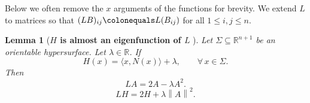 \documentclass[12pt,reqno]{amsart}
\newtheorem{lemma}[theorem]{Lemma}
\theoremstyle{definition}
\renewcommand{\subset}{\subseteq}
\newcommand{\vnormt}[1]{\left\|#1\right\|}    %
\newcommand{\R}{\mathbb{R}}
\newcommand{\embolden}[1]{\textbf {#1}}
\newcommand{\sdimn}{n}
\newcommand{\adimn}{n+1}
\newcommand{\scon}{\lambda}
\begin{document}
Below we often remove the $x$ arguments of the functions for brevity.  We extend $L$ to matrices so that $(LB)_{ij}\colonequals L(B_{ij})$ for all $1\leq i,j\leq\sdimn$.

\begin{lemma}[\embolden{$H$ is almost an eigenfunction of $L$} {\cite[Proposition 1.2]{colding15}} {\cite[Lemma 2.1]{guang15}}]\label{lemma30}
Let $\Sigma\subset\R^{\adimn}$ be an orientable hypersurface.  Let $\scon\in\R$.  If
\begin{equation}\label{three0}
H(x)=\langle x,N(x)\rangle+\scon,\qquad\forall\,x\in\Sigma.
\end{equation}
Then
\begin{equation}\label{three9p}
LA=2A-\scon A^{2}.
\end{equation}
\begin{equation}\label{three9}
LH=2H+\scon\vnormt{A}^{2}.
\end{equation}
\end{lemma}
\end{document}
